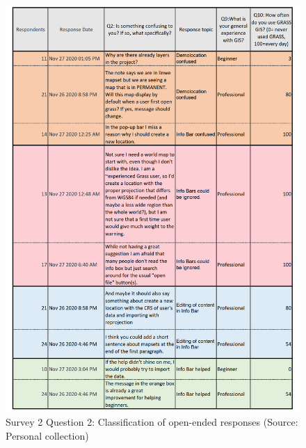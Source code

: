 \documentclass[a4paper,10pt,twoside]{article}
\begin{document}
\newpage
\vspace{0.3cm}
\begin{figure}[hbt!] 
\begin{center}
\includegraphics[width=15.5cm]{../surveys/analyzed_data/survey2_question2.png} 
\caption[Survey 2 Question 2: Classification of open-ended responses]{Survey 2 Question 2: Classification of open-ended responses (Source: Personal collection)}
\label{fig:survey2_question2}
\end{center}
\end{figure}
\end{document}
